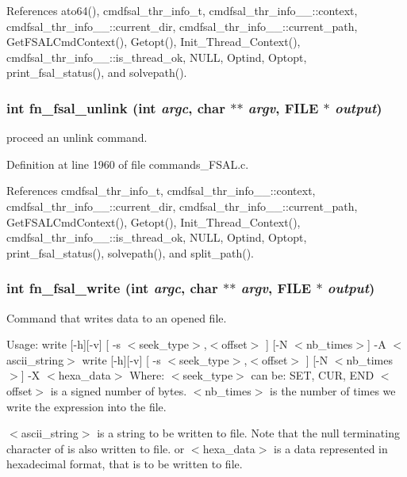 References ato64(), cmdfsal\_\-thr\_\-info\_\-t, cmdfsal\_\-thr\_\-info\_\-\_\-::context, cmdfsal\_\-thr\_\-info\_\-\_\-::current\_\-dir, cmdfsal\_\-thr\_\-info\_\-\_\-::current\_\-path, Get\-FSALCmd\-Context(), Getopt(), Init\_\-Thread\_\-Context(), cmdfsal\_\-thr\_\-info\_\-\_\-::is\_\-thread\_\-ok, NULL, Optind, Optopt, print\_\-fsal\_\-status(), and solvepath().
\subsubsection{\setlength{\rightskip}{0pt plus 5cm}int fn\_\-fsal\_\-unlink (int {\em argc}, char $\ast$$\ast$ {\em argv}, FILE $\ast$ {\em output})}\label{commands__FSAL_8c_a27}


proceed an unlink command. 

Definition at line 1960 of file commands\_\-FSAL.c.

References cmdfsal\_\-thr\_\-info\_\-t, cmdfsal\_\-thr\_\-info\_\-\_\-::context, cmdfsal\_\-thr\_\-info\_\-\_\-::current\_\-dir, cmdfsal\_\-thr\_\-info\_\-\_\-::current\_\-path, Get\-FSALCmd\-Context(), Getopt(), Init\_\-Thread\_\-Context(), cmdfsal\_\-thr\_\-info\_\-\_\-::is\_\-thread\_\-ok, NULL, Optind, Optopt, print\_\-fsal\_\-status(), solvepath(), and split\_\-path().
\subsubsection{\setlength{\rightskip}{0pt plus 5cm}int fn\_\-fsal\_\-write (int {\em argc}, char $\ast$$\ast$ {\em argv}, FILE $\ast$ {\em output})}\label{commands__FSAL_8c_a40}


Command that writes data to an opened file.

Usage: write [-h][-v] [ -s $<$seek\_\-type$>$,$<$offset$>$ ] [-N $<$nb\_\-times$>$] -A $<$ascii\_\-string$>$ write [-h][-v] [ -s $<$seek\_\-type$>$,$<$offset$>$ ] [-N $<$nb\_\-times$>$] -X $<$hexa\_\-data$>$ Where: $<$seek\_\-type$>$ can be: SET, CUR, END $<$offset$>$ is a signed number of bytes. $<$nb\_\-times$>$ is the number of times we write the expression into the file.

$<$ascii\_\-string$>$ is a string to be written to file. Note that the null terminating character of is also written to file. or $<$hexa\_\-data$>$ is a data represented in hexadecimal format, that is to be written to file.

